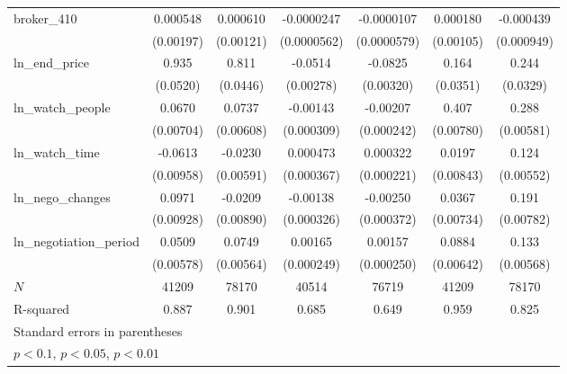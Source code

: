 {\begin{tabular}{l*{6}{c}}
broker\_410  &    0.000548         &    0.000610         &  -0.0000247         &  -0.0000107         &    0.000180         &   -0.000439         \\
            &   (0.00197)         &   (0.00121)         & (0.0000562)         & (0.0000579)         &   (0.00105)         &  (0.000949)         \\
\addlinespace
ln\_end\_price&       0.935\sym{***}&       0.811\sym{***}&     -0.0514\sym{***}&     -0.0825\sym{***}&       0.164\sym{***}&       0.244\sym{***}\\
            &    (0.0520)         &    (0.0446)         &   (0.00278)         &   (0.00320)         &    (0.0351)         &    (0.0329)         \\
\addlinespace
ln\_watch\_people&      0.0670\sym{***}&      0.0737\sym{***}&    -0.00143\sym{***}&    -0.00207\sym{***}&       0.407\sym{***}&       0.288\sym{***}\\
            &   (0.00704)         &   (0.00608)         &  (0.000309)         &  (0.000242)         &   (0.00780)         &   (0.00581)         \\
\addlinespace
ln\_watch\_time&     -0.0613\sym{***}&     -0.0230\sym{***}&    0.000473         &    0.000322         &      0.0197\sym{**} &       0.124\sym{***}\\
            &   (0.00958)         &   (0.00591)         &  (0.000367)         &  (0.000221)         &   (0.00843)         &   (0.00552)         \\
\addlinespace
ln\_nego\_changes&      0.0971\sym{***}&     -0.0209\sym{**} &    -0.00138\sym{***}&    -0.00250\sym{***}&      0.0367\sym{***}&       0.191\sym{***}\\
            &   (0.00928)         &   (0.00890)         &  (0.000326)         &  (0.000372)         &   (0.00734)         &   (0.00782)         \\
\addlinespace
ln\_negotiation\_period&      0.0509\sym{***}&      0.0749\sym{***}&     0.00165\sym{***}&     0.00157\sym{***}&      0.0884\sym{***}&       0.133\sym{***}\\
            &   (0.00578)         &   (0.00564)         &  (0.000249)         &  (0.000250)         &   (0.00642)         &   (0.00568)         \\
\midrule
\(N\)       &       41209         &       78170         &       40514         &       76719         &       41209         &       78170         \\
R-squared   &       0.887         &       0.901         &       0.685         &       0.649         &       0.959         &       0.825         \\
\bottomrule
\multicolumn{7}{l}{\footnotesize Standard errors in parentheses}\\
\multicolumn{7}{l}{\footnotesize \sym{*} \(p<0.1\), \sym{**} \(p<0.05\), \sym{***} \(p<0.01\)}\\
\end{tabular}
}
